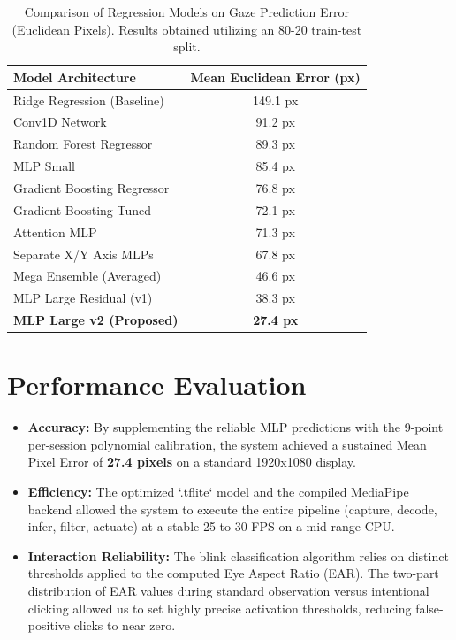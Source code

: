 \documentclass[12pt,a4paper]{report}
\begin{document}
\begin{table}[H]
    \centering
    \caption{Comparison of Regression Models on Gaze Prediction Error (Euclidean Pixels). Results obtained utilizing an 80-20 train-test split.}
    \vspace{0.3cm}
    \renewcommand{\arraystretch}{1.5}
    \begin{tabular}{p{6.5cm} c}
        \toprule
        \textbf{Model Architecture} & \textbf{Mean Euclidean Error (px)} \\
        \midrule
        Ridge Regression (Baseline) & 149.1 px \\
        Conv1D Network & 91.2 px \\
        Random Forest Regressor & 89.3 px \\
        MLP Small & 85.4 px \\
        Gradient Boosting Regressor & 76.8 px \\
        Gradient Boosting Tuned & 72.1 px \\
        Attention MLP & 71.3 px \\
        Separate X/Y Axis MLPs & 67.8 px \\
        Mega Ensemble (Averaged) & 46.6 px \\
        MLP Large Residual (v1) & 38.3 px \\
        \textbf{MLP Large v2 (Proposed)} & \textbf{27.4 px} \\
        \bottomrule
    \end{tabular}
    \label{tab:model_comparison}
\end{table}

\section{Performance Evaluation}
\begin{itemize}
    \item \textbf{Accuracy:} By supplementing the reliable MLP predictions with the 9-point per-session polynomial calibration, the system achieved a sustained Mean Pixel Error of \textbf{27.4 pixels} on a standard 1920x1080 display.
    \item \textbf{Efficiency:} The optimized `.tflite` model and the compiled MediaPipe backend allowed the system to execute the entire pipeline (capture, decode, infer, filter, actuate) at a stable 25 to 30 FPS on a mid-range CPU.
    \item \textbf{Interaction Reliability:} The blink classification algorithm relies on distinct thresholds applied to the computed Eye Aspect Ratio (EAR). The two-part distribution of EAR values during standard observation versus intentional clicking allowed us to set highly precise activation thresholds, reducing false-positive clicks to near zero.
\end{itemize}
\end{document}
